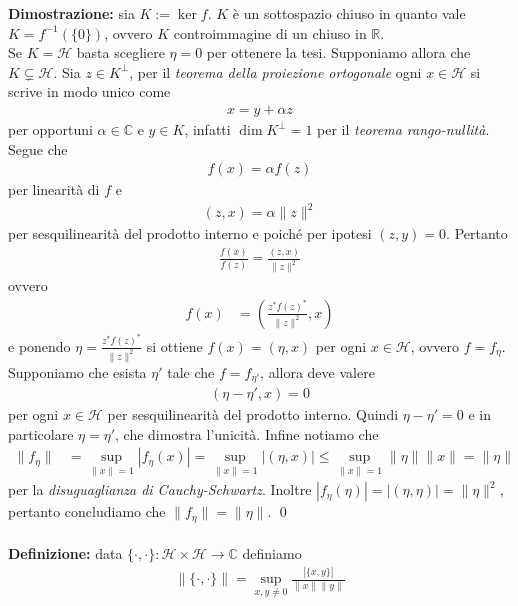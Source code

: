 \documentclass{article}
\numberwithin{equation}{subsection}
\begin{document}
\textbf{Dimostrazione:} sia $K := \ker f$. $K$ è un sottospazio chiuso in quanto vale $K = f^{-1}(\{0\})$, ovvero $K$ controimmagine di un chiuso in $\mathbb{R}$. \\
Se $K = \mathcal{H}$ basta scegliere $\eta = 0$ per ottenere la tesi. Supponiamo allora che $K \subsetneq \mathcal{H}$. Sia $z \in K^\perp$, per il \textit{teorema della proiezione ortogonale} ogni $x \in \mathcal{H}$ si scrive in modo unico come 
\begin{align*}
    x = y + \alpha z 
\end{align*}
per opportuni $\alpha \in \mathbb{C}$ e $y \in K$, infatti $\dim K^\perp = 1$ per il \textit{teorema rango-nullità}. Segue che
\begin{align*}
    f(x) = \alpha f(z) 
\end{align*}
per linearità di $f$ e 
\begin{align*}
    (z, x) = \alpha\|z\|^2 
\end{align*}
per sesquilinearità del prodotto interno e poiché per ipotesi $(z, y) = 0$. Pertanto 
\begin{align*}
    \frac{f(x)}{f(z)} = \frac{(z, x)}{\|z\|^2} 
\end{align*}
ovvero 
\begin{align*}
    f(x) &= \left(\frac{z^*f(z)^*}{\|z\|^2}, x\right) 
\end{align*}
e ponendo $\eta = \frac{z^*f(z)^*}{\|z\|^2}$ si ottiene $f(x) = (\eta, x)$ per ogni $x \in \mathcal{H}$, ovvero $f = f_\eta$. Supponiamo che esista $\eta'$ tale che $f = f_{\eta'}$, allora deve valere 
\begin{align*}
    (\eta - \eta', x) = 0 
\end{align*}
per ogni $x \in \mathcal{H}$ per sesquilinearità del prodotto interno. Quindi $\eta - \eta' = 0$ e in particolare $\eta = \eta'$, che dimostra l'unicità. Infine notiamo che 
\begin{align*}
    \|f_\eta\| &= \sup_{\|x\| = 1}|f_\eta(x)| = \sup_{\|x\| = 1}|(\eta, x)| \leq \sup_{\|x\| = 1}\|\eta\|\|x\| = \|\eta\| 
\end{align*}
per la \textit{disuguaglianza di Cauchy-Schwartz}. Inoltre $|f_\eta(\eta)| = |(\eta, \eta)| = \|\eta\|^2$, pertanto concludiamo che $\|f_\eta\| = \|\eta\|$. \qed \\ \\
\textbf{Definizione:} data $\{\cdot, \cdot\} : \mathcal{H} \times \mathcal{H} \longrightarrow \mathbb{C}$ definiamo 
\begin{align*}
    \|\{\cdot, \cdot\}\| = \sup_{x, y \neq 0}\frac{|\{x, y\}|}{\|x\|\|y\|} 
\end{align*}
\end{document}

